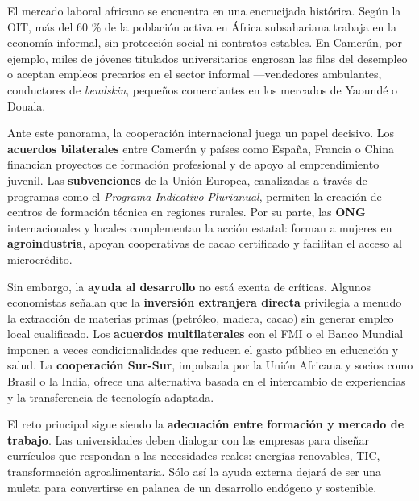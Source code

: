 \documentclass[11pt]{article}
\begin{document}
\begin{textebox}
El mercado laboral africano se encuentra en una encrucijada histórica. Según la OIT, más del 60 \% de la población activa en África subsahariana trabaja en la economía informal, sin protección social ni contratos estables. En Camerún, por ejemplo, miles de jóvenes titulados universitarios engrosan las filas del desempleo o aceptan empleos precarios en el sector informal —vendedores ambulantes, conductores de \emph{bendskin}, pequeños comerciantes en los mercados de Yaoundé o Douala.

Ante este panorama, la cooperación internacional juega un papel decisivo. Los \textbf{acuerdos bilaterales} entre Camerún y países como España, Francia o China financian proyectos de formación profesional y de apoyo al emprendimiento juvenil. Las \textbf{subvenciones} de la Unión Europea, canalizadas a través de programas como el \emph{Programa Indicativo Plurianual}, permiten la creación de centros de formación técnica en regiones rurales. Por su parte, las \textbf{ONG} internacionales y locales complementan la acción estatal: forman a mujeres en \textbf{agroindustria}, apoyan cooperativas de cacao certificado y facilitan el acceso al microcrédito.

Sin embargo, la \textbf{ayuda al desarrollo} no está exenta de críticas. Algunos economistas señalan que la \textbf{inversión extranjera directa} privilegia a menudo la extracción de materias primas (petróleo, madera, cacao) sin generar empleo local cualificado. Los \textbf{acuerdos multilaterales} con el FMI o el Banco Mundial imponen a veces condicionalidades que reducen el gasto público en educación y salud. La \textbf{cooperación Sur-Sur}, impulsada por la Unión Africana y socios como Brasil o la India, ofrece una alternativa basada en el intercambio de experiencias y la transferencia de tecnología adaptada.

El reto principal sigue siendo la \textbf{adecuación entre formación y mercado de trabajo}. Las universidades deben dialogar con las empresas para diseñar currículos que respondan a las necesidades reales: energías renovables, TIC, transformación agroalimentaria. Sólo así la ayuda externa dejará de ser una muleta para convertirse en palanca de un desarrollo endógeno y sostenible.
\end{textebox}
\end{document}
